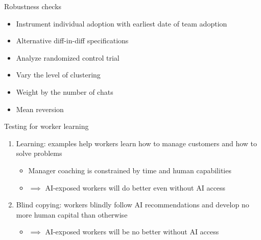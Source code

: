 \documentclass[aspectratio=169,t,11pt,table]{beamer}
\begin{document}
\begin{frame}[label=robustness]{Robustness checks}
\begin{itemize}
    \item Instrument individual adoption with earliest date of team adoption \hyperlink{teamcompanyiv}{} 
    \vspace{3mm}
    \item Alternative diff-in-diff specifications \hyperlink{altspecs}{}
    \vspace{3mm}
    \item Analyze randomized control trial \hyperlink{rct}{}
    \vspace{3mm}
    \item Vary the level of clustering \hyperlink{clustering}{}
    \vspace{3mm}
    \item Weight by the number of chats \hyperlink{weighting}{}
    \vspace{3mm}
        \item Mean reversion \hyperlink{meanrev}{}
\end{itemize}
\end{frame}


\begin{frame}{Testing for worker learning}
\begin{enumerate}
    \item \alert{Learning:} examples help workers learn how to manage customers and how to solve problems
  \pause 
  \bigskip
    \begin{itemize} 
    \item Manager coaching is constrained by time and human capabilities
    \item[] $\implies$ AI-exposed workers will do better even without AI access
    \end{itemize} 
    \pause  
    \bigskip
    \item \alert{Blind copying:} workers blindly follow AI recommendations and develop no more human capital than otherwise
     \bigskip
    \begin{itemize} \pause 
    \item[] $\implies$ AI-exposed workers will be no better without AI access
    \end{itemize} 
\end{enumerate}

\end{frame}
\end{document}
